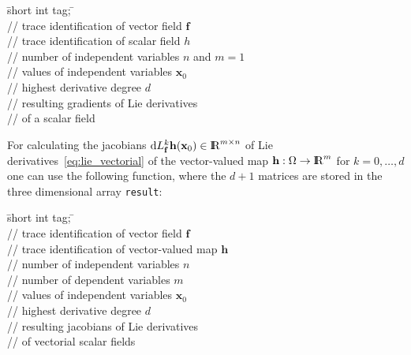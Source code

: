 \documentclass[11pt,twoside]{article}
\newcommand{\R}{{ {\rm I} \kern -.225em {\rm R} }}
\begin{document}
\begin{tabbing}
\hspace{0.5in}\={\sf short int tag;} \hspace{1.1in}\= \kill    %
\\
         \> // trace identification of vector field $\mathbf f$ \\
         \> // trace identification of scalar field $h$\\
               \> // number of independent variables $n$ and $m=1$\\
          \> // values of independent variables $\mathbf{x}_0$\\
               \> // highest derivative degree $d$\\
 \> // resulting gradients of Lie derivatives\\
\>{\sf} \> // of a scalar field\\
\end{tabbing}  

For calculating the jacobians $\mathrm{d}L_\mathbf f^k\mathbf h(\mathbf x_0)\in\R^{m\times n}$
of Lie derivatives~\eqref{eq:lie_vectorial} of the vector-valued map $\mathbf h: \Omega\rightarrow \R^m$ for $k=0,\ldots,d$ one can use the following function, where the $d+1$ matrices are stored in the three dimensional array {\verb=result=}:

\begin{tabbing}
\hspace{0.5in}\={\sf short int tag;} \hspace{1.1in}\= \kill    %
\\
         \> // trace identification of vector field $\mathbf f$ \\
         \> // trace identification of vector-valued map $\mathbf h$\\
               \> // number of independent variables $n$\\
               \> // number of dependent variables $m$\\
          \> // values of independent variables $\mathbf{x}_0$\\
               \> // highest derivative degree $d$\\
 \> // resulting jacobians of Lie derivatives\\
\>{\sf} \> // of vectorial scalar fields\\
\end{tabbing} 
\end{document}
